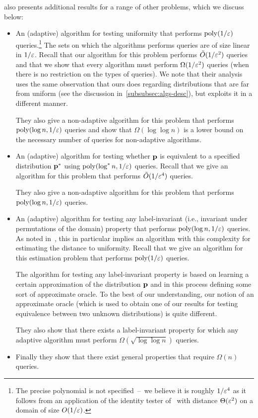 \cite{CFGM:13} also presents additional results for a range of other problems, which we discuss below:
\begin{itemize}
\item An (adaptive) algorithm for testing uniformity that performs $\operatorname*{poly}(1/\varepsilon)$
queries.\footnote{The precise polynomial is not specified~--~we believe it is roughly $1/\varepsilon^4$
as it follows from an application of the identity tester of~\cite{BFFKRW:01}
 with distance $\Theta(\varepsilon^2)$ on a domain of size $O(1/\varepsilon)$.} The sets on which the algorithms performs \COND queries are of size linear in $1/\varepsilon$. Recall that our algorithm for this problem performs $\tilde{O}(1/\varepsilon^2)$
\PCOND queries and that we show that every algorithm must perform $\Omega(1/\varepsilon^2)$
queries (when there is no restriction on the types of queries). We note that their
analysis uses the same observation that ours does regarding distributions that
are far from uniform (see the discussion in~\cref{subsubsec:algs-desc}),
but exploits it in a different manner.

They also give a non-adaptive algorithm for this problem that performs
$\operatorname*{poly}(\log n,1/\varepsilon)$ \COND queries and show that $\Omega(\log\log n)$ is
a lower bound on the necessary number of queries for
 non-adaptive algorithms.
                      
\item An (adaptive) algorithm for testing whether $\mathbf{p}$ is equivalent to a specified
distribution $\mathbf{p}^*$ using $\operatorname*{poly}(\log^\ast n,1/\varepsilon)$ \COND queries. Recall that
we give an algorithm for this problem that performs $\tilde{O}(1/\varepsilon^4)$
\COND queries.

They also give a non-adaptive algorithm for this problem that performs
$\operatorname*{poly}(\log n,1/\varepsilon)$ \COND queries.


\item An (adaptive) algorithm for testing any label-invariant (i.e., invariant
under permutations of the domain) property
that performs $\operatorname*{poly}(\log n,1/\varepsilon)$ \COND queries. As noted in~\cite{CFGM:13},
this in particular implies an algorithm with this complexity for estimating the distance to
uniformity. Recall that we give an algorithm for this estimation problem that
performs $\operatorname*{poly}(1/\varepsilon)$ \PCOND queries.

The algorithm for testing any label-invariant property is based on learning a
certain approximation of the distribution $\mathbf{p}$ and in this process defining
{some sort of} approximate \EVAL oracle. To the best of our understanding,
our notion of an approximate \EVAL oracle (which is used to obtain one
of our results for testing equivalence between two unknown distributions)
is quite different.


They also show that there exists a label-invariant property
for which any adaptive algorithm must perform $\Omega(\sqrt{\log\log n})$
\COND queries.

\item Finally they show that there exist general properties that require $\Omega(n)$ \COND queries.
\end{itemize}

